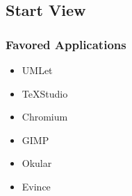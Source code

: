 \subsection{Start View}
    \subsubsection{Favored Applications}
    \begin{itemize}
        \item UMLet
        \item TeXStudio
        \item Chromium
        \item GIMP
        \item Okular
        \item Evince
    \end{itemize}